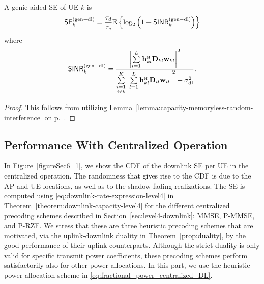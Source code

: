 \begin{corollary} \label{corollary-genie-aided-downlink}
	A genie-aided SE of UE $k$ is
	\begin{equation} \label{eq:genie-aided-downlink-SE}
	\mathsf{SE}_{k}^{({\rm gen-dl})} = \frac{\tau_d}{\tau_c} \mathbb{E} \left\{ \log_2  \left( 1 + \mathsf{SINR}_{k}^{({\rm gen-dl})}  \right) \right\}
	\end{equation}
	where
	\begin{equation} \label{eq:downlink-instant-SINR-genie-aided}
	\mathacr{SINR}_{k}^{({\rm gen-dl})} = \frac{ \left|\sum\limits_{l=1}^L   \vect{h}_{kl}^{\Htran}\vect{D}_{kl} {\vect{w}}_{kl} \right|^2  }{  \condSum{i=1}{i \neq k}{K} \bigg| \sum\limits_{l=1}^{L} \vect{h}_{kl}^{\Htran} \vect{D}_{il} {\vect{w}}_{il} \bigg|^2   +  \sigmaDL}.
	\end{equation}
\end{corollary}
\begin{proof}
	This follows from utilizing Lemma~\ref{lemma:capacity-memoryless-random-interference} on p.~\pageref{lemma:capacity-memoryless-random-interference}.
\end{proof}

\enlargethispage{1.2\baselineskip} 

\subsection{Performance With Centralized Operation}

In Figure~\ref{figureSec6_1}, we show the \gls{CDF} of the downlink SE per UE in the centralized operation. The randomness  that gives rise to the CDF is due to the AP and UE locations, as well as to the shadow fading realizations. The SE is computed using \eqref{eq:downlink-rate-expression-level4} in Theorem~\ref{theorem:downlink-capacity-level4} for the different centralized precoding schemes described in Section~\ref{sec:level4-downlink}: MMSE, P-MMSE, and P-RZF. We stress that these are three heuristic precoding schemes that are motivated, via the uplink-downlink duality in Theorem~\ref{prop:duality}, by the good performance of their uplink counterparts. Although the strict duality is only valid for specific transmit power coefficients, these precoding schemes perform satisfactorily also for other power allocations. In this part, we use the heuristic power allocation scheme in \eqref{eq:fractional_power_centralized_DL}.


